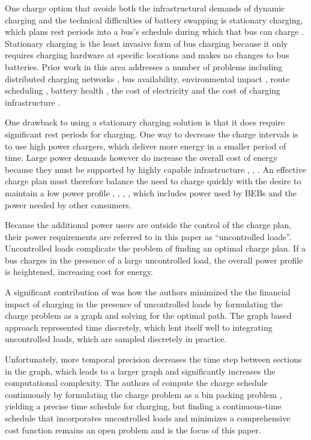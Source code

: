 \par One charge option that avoids both the infrastructural demands of dynamic charging and the technical difficulties of battery swapping is stationary charging, which plans rest periods into a bus's schedule during which that bus can charge \cite{whitaker_network_nodate}. Stationary charging is the least invasive form of bus charging because it only requires charging hardware at specific locations and makes no changes to bus batteries. Prior work in this area addresses a number of problems including distributed charging networks \cite{Nimalsiri2020}, bus availability, environmental impact \cite{zhou_bi-objective_2021}, route scheduling \cite{Rinalde_Mixed_2020}, battery health \cite{houbbadi_optimal_2019}, the cost of electricity \cite{Leou_optimal_2017} and the cost of charging infrastructure \cite{Wei2018}.
\par One drawback to using a stationary charging solution is that it does require significant rest periods for charging. One way to decrease the charge intervals is to use high power chargers, which deliver more energy in a smaller period of time. Large power demands however do increase the overall cost of energy because they must be supported by highly capable infrastructure \cite{stahleder_impact_2019}, \cite{deb_impact_2017}, \cite{boonraksa_impact_2019}. An effective charge plan must therefore balance the need to charge quickly with the desire to maintain a low power profile \cite{cheng_smart_2020}, \cite{ojer_development_2020}, \cite{qin_numerical_2016}, \cite{bagherinezhad_spatio-temporal_2020}, \cite{Wang2019} which includes power used by BEBs and the power needed by other consumers.  
\par Because the additional power users are outside the control of the charge plan, their power requirements are referred to in this paper as ``uncontrolled loads''. Uncontrolled loads complicate the problem of finding an optimal charge plan. If a bus charges in the presence of a large uncontrolled load, the overall power profile is heightened, increasing cost for energy. 
\par A significant contribution of \cite{mortensen_comprehensive_2021} was how the authors minimized the the financial impact of charging in the presence of uncontrolled loads by formulating the charge problem as a graph and solving for the optimal path. The graph based approach represented time discretely, which lent itself well to integrating uncontrolled loads, which are sampled discretely in practice. 
\par Unfortunately, more temporal precision decreases the time step between sections in the graph, which leads to a larger graph and significantly increases the computational complexity. The authors of \cite{brown_position_nodate} compute the charge schedule continuously by formulating the charge problem as a bin packing problem \cite{Ma_Mixed-integer_2017}, yielding a precise time schedule for charging, but finding a continuous-time schedule that incorporates uncontrolled loads and minimizes a comprehensive cost function remains an open problem and is the focus of this paper. 

